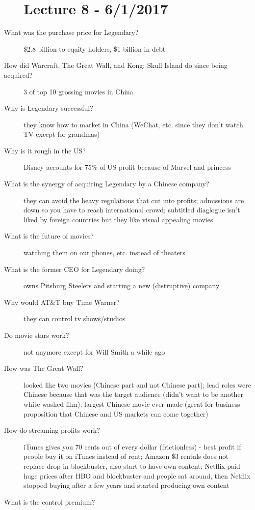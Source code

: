 \documentclass[11pt]{article}
\begin{document}
\begin{description}
\section{Lecture 8 - 6/1/2017}
\item[What was the purchase price for Legendary?]
  \$2.8 billion to equity holders, \$1 billion in debt
\item[How did Warcraft, The Great Wall, and Kong: Skull Island do since being acquired?]
  3 of top 10 grossing movies in China
\item[Why is Legendary successful?]
  they know how to market in China (WeChat, etc. since they don't watch TV except for grandmas)
\item[Why is it rough in the US?]
  Disney accounts for 75\% of US profit because of Marvel and princess
\item[What is the synergy of acquiring Legendary by a Chinese company?]
  they can avoid the heavy regulations that cut into profits;
  admissions are down so you have to reach international crowd;
  subtitled diaglogue isn't liked by foreign countries but they like visual appealing movies
\item[What is the future of movies?]
  watching them on our phones, etc. instead of theaters
\item[What is the former CEO for Legendary doing?]
  owns Pitsburg Steelers and starting a new (distruptive) company
\item[Why would AT\&T buy Time Warner?]
  they can control tv shows/studios
\item[Do movie stars work?]
  not anymore except for Will Smith a while ago
\item[How was The Great Wall?]
  looked like two movies (Chinese part and not Chinese part);
  lead roles were Chinese because that was the target audience (didn't want to be another white-washed film);
  largest Chinese movie ever made (great for business proposition that Chinese and US markets can come together)
\item[How do streaming profits work?]
  iTunes gives you 70 cents out of every dollar (frictionless) - best profit if people buy it on iTunes instead of rent;
  Amazon \$3 rentals does not replace drop in blockbuster, also start to have own content;
  Netflix paid huge prices after HBO and blockbuster and people sat around, then Netflix stopped buying after a few years and started producing own content
\item[What is the control premium?]

\end{description}
\end{document}
